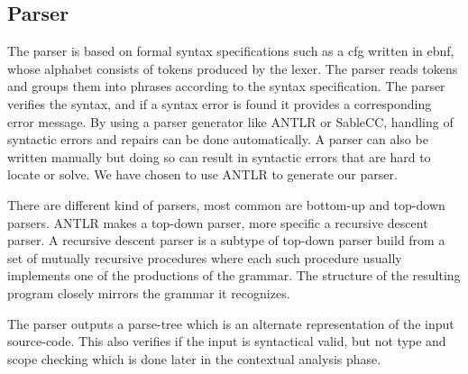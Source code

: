 \subsection*{Parser}
The parser is based on formal syntax specifications such as a \acrfull{cfg} written in \acrfull{ebnf}, whose alphabet consists of tokens produced by the lexer. 
The parser reads tokens and groups them into phrases according to the syntax specification.
The parser verifies the syntax, and if a syntax error is found it provides a corresponding error message. \citep{Crafting_book}
By using a parser generator like ANTLR or SableCC, handling of syntactic errors and repairs can be done automatically.
A parser can also be written manually but doing so can result in syntactic errors that are hard to locate or solve.
We have chosen to use ANTLR to generate our parser.

There are different kind of parsers, most common are bottom-up and top-down parsers.
ANTLR makes a top-down parser, more specific a recursive descent parser.
A recursive descent parser is a subtype of top-down parser build from a set of mutually recursive procedures where each such procedure usually implements one of the productions of the grammar.
The structure of the resulting program closely mirrors the grammar it recognizes. \citep{Recursive_programming}

The parser outputs a parse-tree which is an alternate representation of the input source-code. 
This also verifies if the input is syntactical valid, but not type and scope checking which is done later in the contextual analysis phase. 


